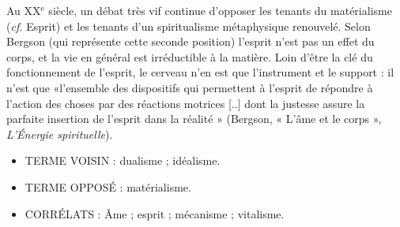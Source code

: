 Au {\footnotesize XX}$^\text{e}$ siècle, un débat très vif continue
d'opposer les tenants du matérialisme
({\it cf.} Esprit) et les tenants d’un spiritualisme métaphysique renouvelé. Selon
Bergson (qui représente cette seconde
position) l'esprit n’est pas un effet du
corps, et la vie en général est irréductible à la matière. Loin d’être la clé du
fonctionnement de l'esprit, le cerveau
n'en est que l'instrument et le support :
il n'est que «l’ensemble des dispositifs
qui permettent à l'esprit de répondre à
l'action des choses par des réactions
motrices [..] dont la justesse assure la
parfaite insertion de l'esprit dans la réalité » (Bergson, « L'âme et le corps », {\it L'Énergie spirituelle}).

\begin{itemize}[leftmargin=1cm, label=, itemsep=1pt]
\item {\footnotesize TERME VOISIN} : dualisme ; idéalisme.
\item {\footnotesize TERME OPPOSÉ} : matérialisme.
\item {\footnotesize CORRÉLATS} : Âme ; esprit ;
mécanisme ; vitalisme.
\end{itemize}

